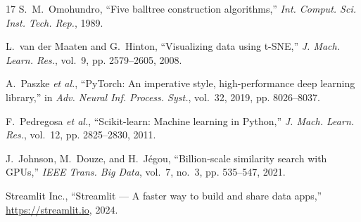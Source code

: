\documentclass[conference]{IEEEtran}
\begin{document}
\begin{thebibliography}{17}
S.~M.~Omohundro,
``Five balltree construction algorithms,''
\emph{Int. Comput. Sci. Inst. Tech. Rep.}, 1989.

L.~van der Maaten and G.~Hinton,
``Visualizing data using t-SNE,''
\emph{J. Mach. Learn. Res.}, vol.~9, pp. 2579--2605, 2008.

A.~Paszke \emph{et al.},
``PyTorch: An imperative style, high-performance deep learning library,''
in \emph{Adv. Neural Inf. Process. Syst.}, vol.~32, 2019, pp. 8026--8037.

F.~Pedregosa \emph{et al.},
``Scikit-learn: Machine learning in Python,''
\emph{J. Mach. Learn. Res.}, vol.~12, pp. 2825--2830, 2011.

J.~Johnson, M.~Douze, and H.~J\'{e}gou,
``Billion-scale similarity search with GPUs,''
\emph{IEEE Trans. Big Data}, vol.~7, no.~3, pp. 535--547, 2021.

Streamlit Inc.,
``Streamlit --- A faster way to build and share data apps,''
\url{https://streamlit.io}, 2024.

\end{thebibliography}
\end{document}
